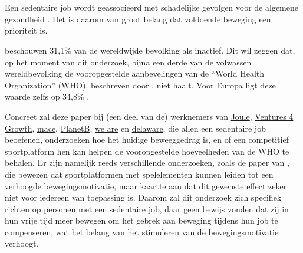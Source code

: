 
\chapter{}%
\label{ch:inleiding}


\section{}%
\label{sec:probleemstelling}

Een sedentaire job wordt geassocieerd met schadelijke gevolgen voor de algemene gezondheid \autocite{Buckley2015}. Het is daarom van groot belang dat voldoende beweging een prioriteit is.

\textcite{Hallal2012} beschouwen 31,1\% van de wereldwijde bevolking als inactief. Dit wil zeggen dat, op het moment van dit onderzoek, bijna een derde van de volwassen wereldbevolking de vooropgestelde aanbevelingen van de ``World Health Organization'' (WHO), beschreven door \textcite{Bull2020}, niet haalt. Voor Europa ligt deze waarde zelfs op 34,8\% \autocite{Bull2020}.

Concreet zal deze paper bij (een deel van de) werknemers van \href{https://en.joule.be/}{Joule}, \href{https://www.ventures4growth.com/en}{Ventures 4 Growth}, \href{https://www.mace-legal.com/}{mace}, \href{https://planetb.life/en}{PlanetB}, \href{https://www.we-are.be/}{we are} en \href{https://www.delaware.pro/en-be}{delaware}, die allen een sedentaire job beoefenen, onderzoeken hoe het huidige beweeggedrag is, en of een competitief sportplatform hen kan helpen de vooropgestelde hoeveelheden van de WHO te behalen. Er zijn namelijk reeds verschillende onderzoeken, zoals de paper van \textcite{Kari2016}, die bewezen dat sportplatformen met spelelementen kunnen leiden tot een verhoogde bewegingsmotivatie, maar \textcite{Hamari2013a} kaartte aan dat dit gewenste effect zeker niet voor iedereen van toepassing is. Daarom zal dit onderzoek zich specifiek richten op personen met een sedentaire job, daar \textcite{Vandelanotte2015} geen bewijs vonden dat zij in hun vrije tijd meer bewegen om het gebrek aan beweging tijdens hun job te compenseren, wat het belang van het stimuleren van de bewegingsmotivatie verhoogt.


